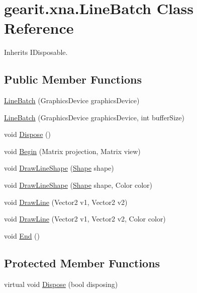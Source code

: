 \hypertarget{classgearit_1_1xna_1_1_line_batch}{\section{gearit.\+xna.\+Line\+Batch Class Reference}
\label{classgearit_1_1xna_1_1_line_batch}
}


Inherits I\+Disposable.

\subsection*{Public Member Functions}
\begin{DoxyCompactItemize}
\item 
\hyperlink{classgearit_1_1xna_1_1_line_batch_a0a6a5fc6bec5a63ea2d3462ddf3aeca6}{Line\+Batch} (Graphics\+Device graphics\+Device)
\item 
\hyperlink{classgearit_1_1xna_1_1_line_batch_aa1a0ef9193f9db23e31942e87f253417}{Line\+Batch} (Graphics\+Device graphics\+Device, int buffer\+Size)
\item 
void \hyperlink{classgearit_1_1xna_1_1_line_batch_ac1562f31f5c0200336f410a057f719e0}{Dispose} ()
\item 
void \hyperlink{classgearit_1_1xna_1_1_line_batch_ac808bb06950df6bc0f217bdf945c2079}{Begin} (Matrix projection, Matrix view)
\item 
void \hyperlink{classgearit_1_1xna_1_1_line_batch_a57c2c785d0d4decc02e1d0b51cb16c6e}{Draw\+Line\+Shape} (\hyperlink{class_farseer_physics_1_1_collision_1_1_shapes_1_1_shape}{Shape} shape)
\item 
void \hyperlink{classgearit_1_1xna_1_1_line_batch_a4f3f599433b0abc56d0777c45bb08228}{Draw\+Line\+Shape} (\hyperlink{class_farseer_physics_1_1_collision_1_1_shapes_1_1_shape}{Shape} shape, Color color)
\item 
void \hyperlink{classgearit_1_1xna_1_1_line_batch_a8e76ceee48b0104c5d732589bff3b9dd}{Draw\+Line} (Vector2 v1, Vector2 v2)
\item 
void \hyperlink{classgearit_1_1xna_1_1_line_batch_ae42b08bca2113be2c08b32859bdeb9a7}{Draw\+Line} (Vector2 v1, Vector2 v2, Color color)
\item 
void \hyperlink{classgearit_1_1xna_1_1_line_batch_a6423758a718c56d0904491a06ef86c23}{End} ()
\end{DoxyCompactItemize}
\subsection*{Protected Member Functions}
\begin{DoxyCompactItemize}
\item 
virtual void \hyperlink{classgearit_1_1xna_1_1_line_batch_a7b85a082fca80cf1115d00d12077163b}{Dispose} (bool disposing)
\end{DoxyCompactItemize}


